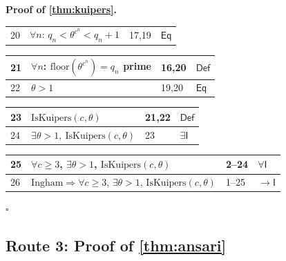 \documentclass[11pt,reqno]{amsart}
\theoremstyle{blueplain}
\renewcommand{\qedsymbol}{\textcolor{proofqed}{\ensuremath{\square}}}
\renewenvironment{proof}[1][Proof]{\par\noindent\textbf{\textcolor{proofhead}{#1.}}\par\nobreak}{\par\nobreak\hfill\qedsymbol}
\numberwithin{equation}{section}
\begin{document}
\begin{proof}[\textbf{Proof of \cref{thm:kuipers}}]
{\begin{tabular}{|m{0.7cm}|m{12cm}|m{1.4cm}|m{2.5cm}|}
20 & $\forall n$: $q_n<\theta^{c^{n}}<q_n+1$ & 17,19 & $\mathsf{Eq}$ \\
\end{tabular}%
\noindent \newline
\noindent
\begin{tabular}{|m{0.7cm}|m{12cm}|m{1.4cm}|m{2.5cm}|}
\hline
21 & $\forall n$: $\mathrm{floor}(\theta^{c^{n}})=q_n$ prime & 16,20 & $\mathsf{Def}$ \\ \hline
22 & $\theta>1$ & 19,20 & $\mathsf{Eq}$ \\
\end{tabular}%
\noindent \newline
\noindent
\begin{tabular}{|m{0.7cm}|m{12cm}|m{1.4cm}|m{2.5cm}|}
\hline
23 & $\mathrm{IsKuipers}(c,\theta)$ & 21,22 & $\mathsf{Def}$ \\ \hline
24 & $\exists\theta>1,\ \mathrm{IsKuipers}(c,\theta)$ & 23 & $\exists\mathsf{I}$ \\
\end{tabular}%
\noindent \newline
\noindent
\begin{tabular}{|m{0.7cm}|m{12cm}|m{1.4cm}|m{2.5cm}|}
\hline
25 & $\forall c\ge 3$, $\exists\theta>1$, $\mathrm{IsKuipers}(c,\theta)$ & 2--24 & $\forall\mathsf{I}$ \\ \hline
26 & $\text{Ingham}\Rightarrow\forall c\ge 3$, $\exists\theta>1$, $\mathrm{IsKuipers}(c,\theta)$ & 1--25 & $\rightarrow\mathsf{I}$ \\
\end{tabular}%
}
\end{proof}

\subsection{Route 3: Proof of \cref{thm:ansari}}
\end{document}
